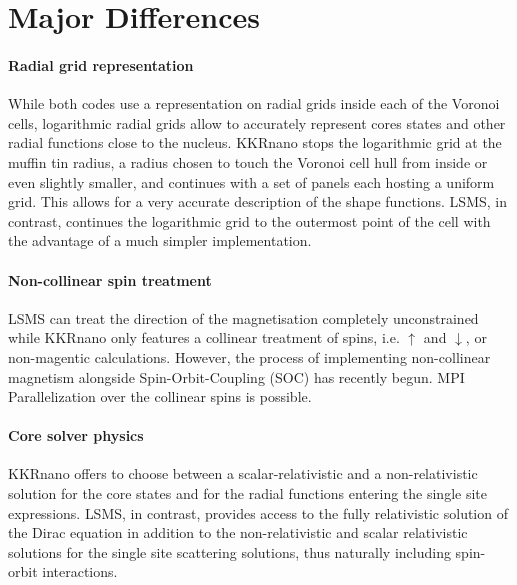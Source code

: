 \documentclass{llncs}
\def\KKRnano{{KKRnano}}
\def\LSMS{{LSMS}}
\begin{document}
\section{Major Differences} \label{section:differ}

\paragraph{Radial grid representation}
While both codes use a representation on radial grids inside each of the Voronoi cells,
logarithmic radial grids allow to accurately represent cores states and other radial functions
close to the nucleus. \KKRnano{} stops the logarithmic grid at the muffin tin radius,
a radius chosen to touch the Voronoi cell hull from inside or even slightly smaller, and 
continues with a set of panels each hosting a uniform grid. This allows for a very accurate
description of the shape functions. \LSMS{}, in contrast, continues the logarithmic grid
to the outermost point of the cell with the advantage of a much simpler implementation.

\paragraph{Non-collinear spin treatment}
\LSMS{} can treat the direction of the magnetisation completely unconstrained
while \KKRnano{} only features a collinear treatment of spins, i.e. $\uparrow$ and $\downarrow$, 
or non-magentic calculations. However, the process of implementing non-collinear
magnetism alongside Spin-Orbit-Coupling (SOC) has recently begun.
MPI Parallelization over the collinear spins is possible.

\paragraph{Core solver physics}
\KKRnano{} offers to choose between a scalar-relativistic and a non-relativistic solution for the core states 
and for the radial functions entering the single site expressions. 
\LSMS{}, in contrast, provides access to the fully relativistic
solution of the Dirac equation in addition to the non-relativistic and
scalar relativistic solutions for the single site scattering
solutions, thus naturally including spin-orbit interactions.
%
\end{document}
